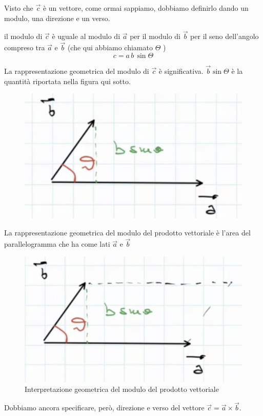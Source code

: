Visto che $ \overrightarrow{c} $ è un vettore, come ormai sappiamo, dobbiamo definirlo dando un modulo, una direzione e un verso.

il modulo di $ \overrightarrow{c} $ è uguale al modulo di $ \overrightarrow{a} $ per il modulo di $ \overrightarrow{b} $ per il seno dell'angolo compreso tra $\overrightarrow{a}$ e $ \overrightarrow{b} $ (che qui abbiamo chiamato $ \Theta $ )
$$ c = a \, b \,  \sin \Theta $$

\newpage
La rappresentazione geometrica del modulo di $ \overrightarrow{c} $ è significativa. $\overrightarrow{b} \sin \Theta $ è la quantità riportata nella figura qui sotto.

\begin{figure}[h]
\begin{center}
\includegraphics[width = 0.5 \textwidth]{lezione1/images/vettoriale2}
\label{fig:vettoriale2}
\end{center}
\end{figure}

La rappresentazione geometrica del modulo del prodotto vettoriale è l'area del parallelogramma che ha come lati $ \overrightarrow{a} $ e $  \overrightarrow{b} $

\begin{figure}[h]
\begin{center}
\includegraphics[width = 0.5 \textwidth]{lezione1/images/vettoriale3}
\caption{Interpretazione geometrica del modulo del prodotto vettoriale}
\label{fig:vettoriale3}
\end{center}
\end{figure}

Dobbiamo ancora specificare, però, direzione e verso del vettore $ \overrightarrow{c} = \overrightarrow{a} \times \overrightarrow{b} $.

